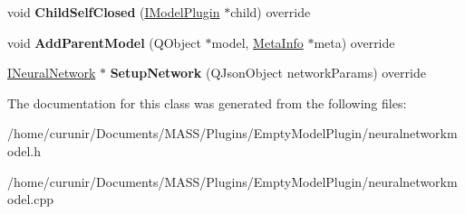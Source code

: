\begin{DoxyCompactItemize}
\item 
void {\bfseries Child\+Self\+Closed} (\hyperlink{class_i_model_plugin}{I\+Model\+Plugin} $\ast$child) override\hypertarget{class_neural_network_model_aed4269880cfc1c385e5904b1f415580b}{}\label{class_neural_network_model_aed4269880cfc1c385e5904b1f415580b}

\item 
void {\bfseries Add\+Parent\+Model} (Q\+Object $\ast$model, \hyperlink{struct_meta_info}{Meta\+Info} $\ast$meta) override\hypertarget{class_neural_network_model_ab4aa81f9f7860f62dd7c6223cb24e455}{}\label{class_neural_network_model_ab4aa81f9f7860f62dd7c6223cb24e455}

\item 
\hyperlink{class_i_neural_network_model_1_1_i_neural_network}{I\+Neural\+Network} $\ast$ {\bfseries Setup\+Network} (Q\+Json\+Object network\+Params) override\hypertarget{class_neural_network_model_a2b115f31c0e9116c2ea3134a29e8dc24}{}\label{class_neural_network_model_a2b115f31c0e9116c2ea3134a29e8dc24}

\end{DoxyCompactItemize}


The documentation for this class was generated from the following files\+:\begin{DoxyCompactItemize}
\item 
/home/curunir/\+Documents/\+M\+A\+S\+S/\+Plugins/\+Empty\+Model\+Plugin/neuralnetworkmodel.\+h\item 
/home/curunir/\+Documents/\+M\+A\+S\+S/\+Plugins/\+Empty\+Model\+Plugin/neuralnetworkmodel.\+cpp\end{DoxyCompactItemize}
